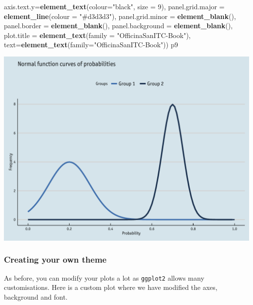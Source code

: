 \documentclass[]{article}
\newenvironment{Shaded}{\begin{snugshade}}{\end{snugshade}}
\newcommand{\KeywordTok}[1]{\textcolor[rgb]{0.13,0.29,0.53}{\textbf{{#1}}}}
\newcommand{\DataTypeTok}[1]{\textcolor[rgb]{0.13,0.29,0.53}{{#1}}}
\newcommand{\DecValTok}[1]{\textcolor[rgb]{0.00,0.00,0.81}{{#1}}}
\newcommand{\StringTok}[1]{\textcolor[rgb]{0.31,0.60,0.02}{{#1}}}
\newcommand{\NormalTok}[1]{{#1}}
\begin{document}
\begin{Shaded}
\begin{Highlighting}[]
            \DataTypeTok{axis.text.y=}\KeywordTok{element_text}\NormalTok{(}\DataTypeTok{colour=}\StringTok{"black"}\NormalTok{, }\DataTypeTok{size =} \DecValTok{9}\NormalTok{),}
            \DataTypeTok{panel.grid.major =} \KeywordTok{element_line}\NormalTok{(}\DataTypeTok{colour =} \StringTok{"#d3d3d3"}\NormalTok{), }
            \DataTypeTok{panel.grid.minor =} \KeywordTok{element_blank}\NormalTok{(), }
            \DataTypeTok{panel.border =} \KeywordTok{element_blank}\NormalTok{(), }\DataTypeTok{panel.background =} \KeywordTok{element_blank}\NormalTok{(),}
            \DataTypeTok{plot.title =} \KeywordTok{element_text}\NormalTok{(}\DataTypeTok{family =} \StringTok{"OfficinaSanITC-Book"}\NormalTok{),}
            \DataTypeTok{text=}\KeywordTok{element_text}\NormalTok{(}\DataTypeTok{family=}\StringTok{"OfficinaSanITC-Book"}\NormalTok{))}
\NormalTok{p9}
\end{Highlighting}
\end{Shaded}

\begin{center}\includegraphics{0_all_posts_pdf/function_15-1} \end{center}

\subsubsection{Creating your own theme}\label{creating-your-own-theme-8}

As before, you can modify your plots a lot as \texttt{ggplot2} allows
many customisations. Here is a custom plot where we have modified the
axes, background and font.
\end{document}
